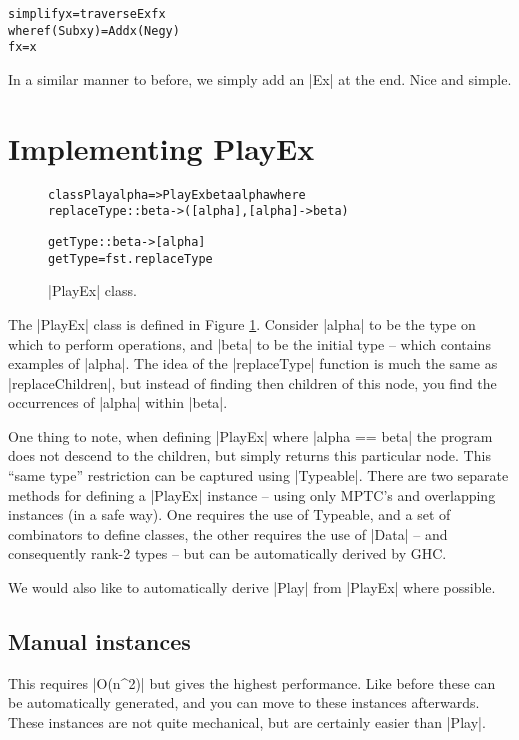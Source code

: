 \documentclass[preprint]{sigplanconf}
\newenvironment{code}{\begin{alltt}\small}{\end{alltt}}
\begin{document}
\begin{code}
simplify x = traverseEx f x
    where  f (Sub x y)  = Add x (Neg y)
           f x          = x
\end{code}

In a similar manner to before, we simply add an |Ex| at the end. Nice and simple.


\section{Implementing PlayEx}


\begin{figure}
\begin{code}
class Play alpha => PlayEx beta alpha where
    replaceType :: beta -> ([alpha], [alpha] -> beta)

    getType :: beta -> [alpha]
    getType = fst . replaceType
\end{code}
\caption{|PlayEx| class.}
\label{fig:playex}
\end{figure}


The |PlayEx| class is defined in Figure \ref{fig:playex}. Consider |alpha| to be the type on which to perform operations, and |beta| to be the initial type -- which contains examples of |alpha|. The idea of the |replaceType| function is much the same as |replaceChildren|, but instead of finding then children of this node, you find the occurrences of |alpha| within |beta|.

One thing to note, when defining |PlayEx| where |alpha == beta| the program does not descend to the children, but simply returns this particular node. This ``same type'' restriction can be captured using |Typeable|. There are two separate methods for defining a |PlayEx| instance -- using only MPTC's and overlapping instances (in a safe way). One requires the use of Typeable, and a set of combinators to define classes, the other requires the use of |Data| -- and consequently rank-2 types -- but can be automatically derived by GHC.

We would also like to automatically derive |Play| from |PlayEx| where possible.

\subsection{Manual instances}

This requires |O(n^2)| but gives the highest performance. Like before these can be automatically generated, and you can move to these instances afterwards. These instances are not quite mechanical, but are certainly easier than |Play|.
\end{document}
